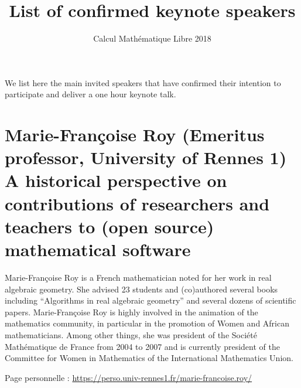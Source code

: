 \documentclass{paper}
\title{List of confirmed keynote speakers}
\subtitle{Calcul Mathématique Libre 2018}
\date{}
\newcommand{\orateur}[3]{%
  \section*{%
    #1 {\small(#2)}\nopagebreak\\
    #3}
}
\begin{document}
\maketitle
\thispagestyle{empty}

We list here the main invited speakers that have confirmed their
intention to participate and deliver a one hour keynote talk.



\orateur
{Marie-Françoise Roy}
{Emeritus professor, University of Rennes 1}
{A historical perspective on contributions of researchers and teachers
  to (open source) mathematical software}

Marie-Françoise Roy is a French mathematician noted for her work in
real algebraic geometry. She advised 23 students and (co)authored
several books including ``Algorithms in real algebraic geometry'' and
several dozens of scientific papers. Marie-Françoise Roy is highly
involved in the animation of the mathematics community, in particular
in the promotion of Women and African mathematicians. Among other
things, she was president of the Société Mathématique de France from
2004 to 2007 and is currently president of the Committee for Women in
Mathematics of the International Mathematics Union.

\medskip

Page personnelle : \url{https://perso.univ-rennes1.fr/marie-francoise.roy/}
\end{document}
